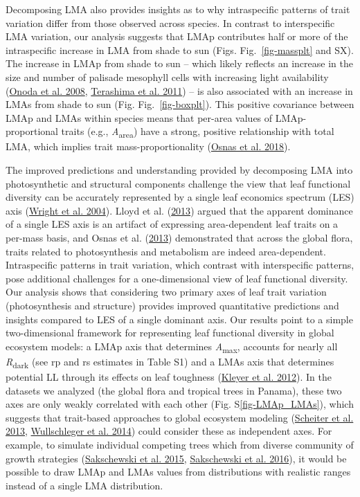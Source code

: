 \documentclass[
  12pt,
  a4paper,
,tablecaptionabove
]{scrartcl}
\begin{document}
Decomposing LMA also provides insights as to why intraspecific patterns
of trait variation differ from those observed across species. In
contrast to interspecific LMA variation, our analysis suggests that LMAp
contributes half or more of the intraspecific increase in LMA from shade
to sun (Figs. Fig.~\ref{fig-massplt} and SX). The increase in LMAp from
shade to sun -- which likely reflects an increase in the size and number
of palisade mesophyll cells with increasing light availability
(\protect\hyperlink{ref-Onoda2008}{Onoda et al. 2008},
\protect\hyperlink{ref-Terashima2011}{Terashima et al. 2011}) -- is also
associated with an increase in LMAs from shade to sun (Fig.
Fig.~\ref{fig-boxplt}). This positive covariance between LMAp and LMAs
within species means that per-area values of LMAp-proportional traits
(e.g., \emph{A}\textsubscript{area}) have a strong, positive
relationship with total LMA, which implies trait mass-proportionality
(\protect\hyperlink{ref-Osnas2018}{Osnas et al. 2018}).

The improved predictions and understanding provided by decomposing LMA
into photosynthetic and structural components challenge the view that
leaf functional diversity can be accurately represented by a single leaf
economics spectrum (LES) axis
(\protect\hyperlink{ref-Wright2004a}{Wright et al. 2004}). Lloyd et al.
(\protect\hyperlink{ref-Lloyd2013}{2013}) argued that the apparent
dominance of a single LES axis is an artifact of expressing
area-dependent leaf traits on a per-mass basis, and Osnas et al.
(\protect\hyperlink{ref-Osnas2013}{2013}) demonstrated that across the
global flora, traits related to photosynthesis and metabolism are indeed
area-dependent. Intraspecific patterns in trait variation, which
contrast with interspecific patterns, pose additional challenges for a
one-dimensional view of leaf functional diversity. Our analysis shows
that considering two primary axes of leaf trait variation
(photosynthesis and structure) provides improved quantitative
predictions and insights compared to LES of a single dominant axis. Our
results point to a simple two-dimensional framework for representing
leaf functional diversity in global ecosystem models: a LMAp axis that
determines \emph{A}\textsubscript{max}, accounts for nearly all
\emph{R}\textsubscript{dark} (see rp and rs estimates in Table S1) and a
LMAs axis that determines potential LL through its effects on leaf
toughness (\protect\hyperlink{ref-Kleyer2012}{Kleyer et al. 2012}). In
the datasets we analyzed (the global flora and tropical trees in
Panama), these two axes are only weakly correlated with each other (Fig.
S\ref{fig-LMAp_LMAs}), which suggests that trait-based approaches to
global ecosystem modeling (\protect\hyperlink{ref-Scheiter2013}{Scheiter
et al. 2013}, \protect\hyperlink{ref-Wullschleger2014}{Wullschleger et
al. 2014}) could consider these as independent axes. For example, to
simulate individual competing trees which from diverse community of
growth strategies (\protect\hyperlink{ref-Sakschewski2015}{Sakschewski
et al. 2015}, \protect\hyperlink{ref-Sakschewski2016}{Sakschewski et al.
2016}), it would be possible to draw LMAp and LMAs values from
distributions with realistic ranges instead of a single LMA
distribution.
\end{document}
